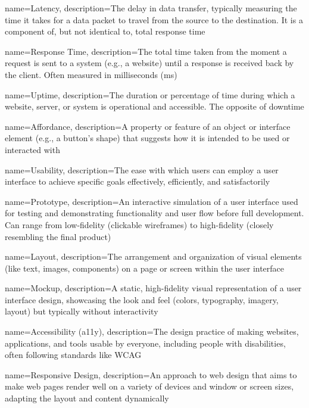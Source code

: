 {
    name=Latency,
    description={The delay in data transfer, typically measuring the time it takes for a data packet to travel from the source to the destination. It is a component of, but not identical to, total response time}
}

{
    name=Response Time,
    description={The total time taken from the moment a request is sent to a system (e.g., a website) until a response is received back by the client. Often measured in milliseconds (ms)}
}

{
    name=Uptime,
    description={The duration or percentage of time during which a website, server, or system is operational and accessible. The opposite of downtime}
}

{
    name=Affordance,
    description={A property or feature of an object or interface element (e.g., a button's shape) that suggests how it is intended to be used or interacted with}
}

{
    name=Usability,
    description={The ease with which users can employ a user interface to achieve specific goals effectively, efficiently, and satisfactorily}
}

{
    name=Prototype,
    description={An interactive simulation of a user interface used for testing and demonstrating functionality and user flow before full development. Can range from low-fidelity (clickable wireframes) to high-fidelity (closely resembling the final product)}
}

{
    name=Layout,
    description={The arrangement and organization of visual elements (like text, images, components) on a page or screen within the user interface}
}


{
    name=Mockup,
    description={A static, high-fidelity visual representation of a user interface design, showcasing the look and feel (colors, typography, imagery, layout) but typically without interactivity}
}

{
    name=Accessibility (a11y),
    description={The design practice of making websites, applications, and tools usable by everyone, including people with disabilities, often following standards like WCAG}
}

{
    name=Responsive Design,
    description={An approach to web design that aims to make web pages render well on a variety of devices and window or screen sizes, adapting the layout and content dynamically}
}

